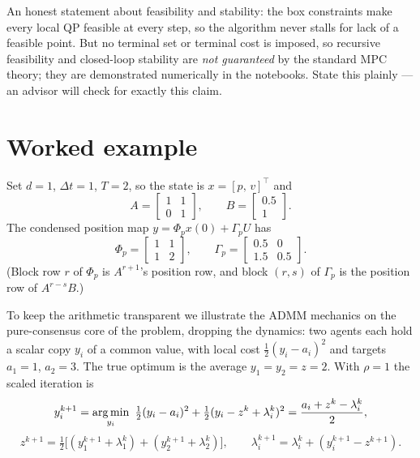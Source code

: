 \documentclass[11pt]{article}
\begin{document}
An honest statement about feasibility and stability: the box constraints make every local
QP feasible at every step, so the algorithm never stalls for lack of a feasible point. But
no terminal set or terminal cost is imposed, so recursive feasibility and closed-loop
stability are \emph{not guaranteed} by the standard MPC theory; they are demonstrated
numerically in the notebooks. State this plainly --- an advisor will check for exactly this
claim.

\section{Worked example}

Set $d = 1$, $\Delta t = 1$, $T = 2$, so the state is $x = [p,\,v]^\top$ and
\begin{equation}
A = \begin{bmatrix} 1 & 1 \\ 0 & 1 \end{bmatrix},
\qquad
B = \begin{bmatrix} 0.5 \\ 1 \end{bmatrix}.
\end{equation}
The condensed position map $y = \Phi_p x(0) + \Gamma_p U$ has
\begin{equation}
\Phi_p = \begin{bmatrix} 1 & 1 \\ 1 & 2 \end{bmatrix},
\qquad
\Gamma_p = \begin{bmatrix} 0.5 & 0 \\ 1.5 & 0.5 \end{bmatrix}.
\end{equation}
(Block row $r$ of $\Phi_p$ is $A^{r+1}$'s position row, and block $(r,s)$ of $\Gamma_p$ is
the position row of $A^{r-s}B$.)

To keep the arithmetic transparent we illustrate the ADMM mechanics on the pure-consensus
core of the problem, dropping the dynamics: two agents each hold a scalar copy $y_i$ of a
common value, with local cost $\tfrac12 (y_i - a_i)^2$ and targets $a_1 = 1$, $a_2 = 3$.
The true optimum is the average $y_1 = y_2 = z = 2$. With $\rho = 1$ the scaled iteration
is
\begin{equation}
y_i^{k+1} = \operatorname*{arg\,min}_{y_i}\ \tfrac12(y_i - a_i)^2 + \tfrac12(y_i - z^k + \lambda_i^k)^2
= \frac{a_i + z^k - \lambda_i^k}{2},
\end{equation}
\begin{equation}
z^{k+1} = \tfrac12\big[(y_1^{k+1} + \lambda_1^k) + (y_2^{k+1} + \lambda_2^k)\big],
\qquad
\lambda_i^{k+1} = \lambda_i^k + (y_i^{k+1} - z^{k+1}).
\end{equation}
\end{document}

